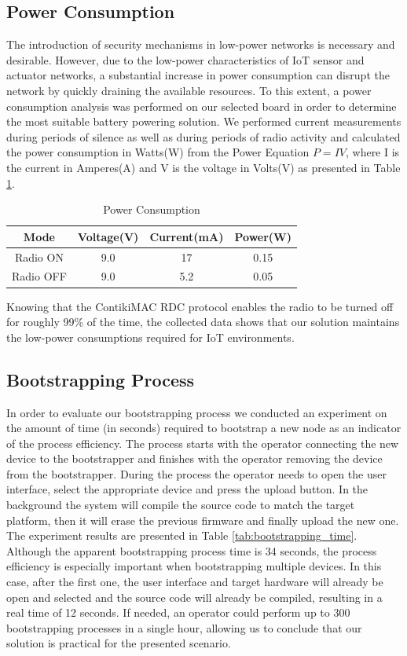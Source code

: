 \documentclass{llncs}
\begin{document}
\subsection{Power Consumption}
The introduction of security mechanisms in low-power networks is necessary and desirable. However, due to the low-power characteristics of \ac{IoT} sensor and actuator networks, a substantial increase in power consumption can disrupt the network by quickly draining the available resources. 
To this extent, a power consumption analysis was performed on our selected board in order to determine the most suitable battery powering solution. 
We performed current measurements during periods of silence as well as during periods of radio activity and calculated the power consumption in Watts(W) from the Power Equation $P = I  V$, where I is the current in Amperes(A) and V is the voltage in Volts(V) as presented in Table \ref{tab:power_consumptions}.

\begin{table}
\centering
\caption{Power Consumption}
\label{tab:power_consumptions}
\begin{tabular}{|c|c|c|c|} \hline
Mode&Voltage(V)&Current(mA)&Power(W)\\ \hline
Radio ON& 9.0& 17&0.15\\ \hline
Radio OFF& 9.0& 5.2&0.05\\ 
\hline\end{tabular}
\end{table}

Knowing that the ContikiMAC \ac{RDC} protocol enables the radio to be turned off for roughly 99\% of the time\cite{Dunkels2011}, the collected data shows that our solution maintains the low-power consumptions required for \ac{IoT} environments.

\subsection{Bootstrapping Process}
In order to evaluate our bootstrapping process we conducted an experiment on the amount of time (in seconds) required to bootstrap a new node as an indicator of the process efficiency. The process starts with the operator connecting the new device to the bootstrapper and finishes with the operator removing the device from the bootstrapper. During the process the operator needs to open the user interface, select the appropriate device and press the upload button. In the background the system will compile the source code to match the target platform, then it will erase the previous firmware and finally upload the new one. The experiment results are presented in Table \ref{tab:bootstrapping_time}. Although the apparent bootstrapping process time is 34 seconds, the process efficiency is especially important when bootstrapping multiple devices. In this case, after the first one, the user interface and target hardware will already be open and selected and the source code will already be compiled, resulting in a real time of 12 seconds. If needed, an operator could perform up to 300 bootstrapping processes in a single hour, allowing us to conclude that our solution is practical for the presented scenario.
\end{document}
